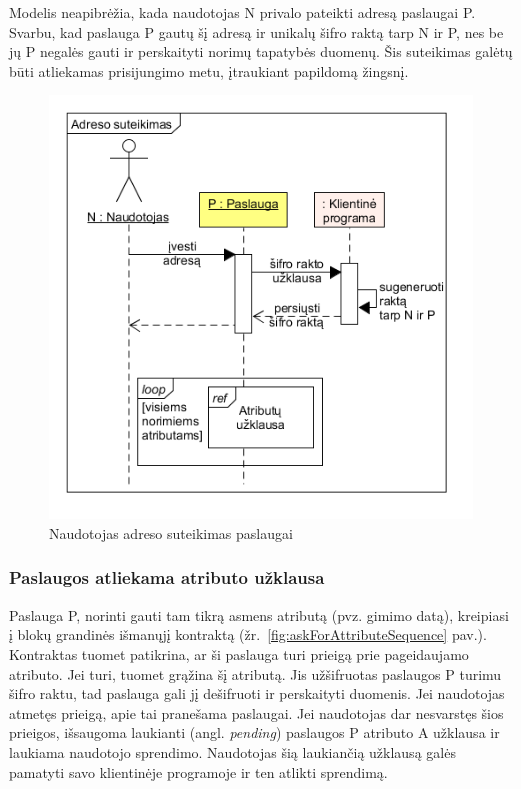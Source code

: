 Modelis neapibrėžia, kada naudotojas N privalo pateikti adresą paslaugai P. Svarbu, kad paslauga P gautų šį adresą ir unikalų šifro raktą tarp N ir P,
nes be jų P negalės gauti ir perskaityti norimų tapatybės duomenų. Šis suteikimas galėtų būti atliekamas prisijungimo metu, įtraukiant
papildomą žingsnį.

\begin{figure}[h]
    \centering
    \includegraphics[scale=0.6]{img/userGivesAddress}
    \caption{Naudotojas adreso suteikimas paslaugai}
    \label{fig:userGivesAddress}
\end{figure}

\subsubsection{Paslaugos atliekama atributo užklausa} \label{BCIDM:askForAttribute}

Paslauga P, norinti gauti tam tikrą asmens atributą (pvz. gimimo datą), kreipiasi į blokų grandinės išmanųjį kontraktą (žr.~\ref{fig:askForAttributeSequence} pav.).
Kontraktas tuomet patikrina, ar ši paslauga turi prieigą prie pageidaujamo atributo. Jei turi, tuomet grąžina šį atributą. Jis
užšifruotas paslaugos P turimu šifro raktu, tad paslauga gali jį dešifruoti ir perskaityti duomenis. Jei
naudotojas atmetęs prieigą, apie tai pranešama paslaugai. Jei naudotojas dar nesvarstęs šios prieigos, išsaugoma laukianti
(angl. \textit{pending}) paslaugos P atributo A užklausa ir laukiama naudotojo sprendimo. Naudotojas šią laukiančią užklausą galės pamatyti savo 
klientinėje programoje ir ten atlikti sprendimą.

